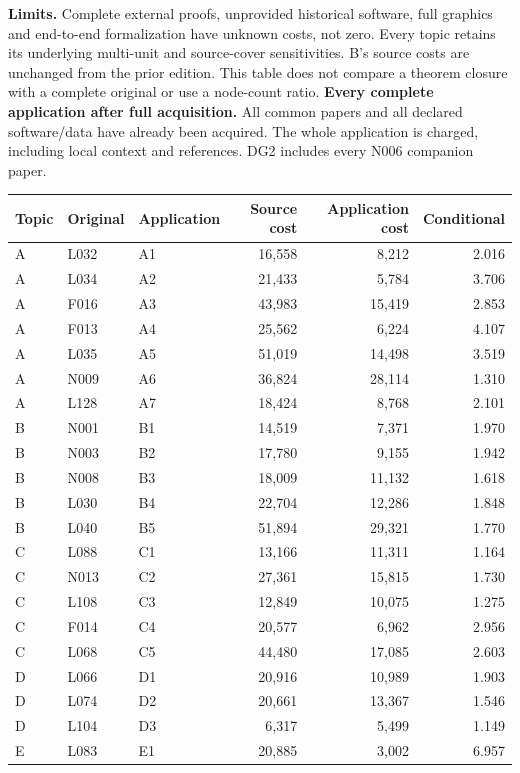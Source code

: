 \documentclass[11pt,a4paper]{article}
\newcommand{\tabsetup}{\small\setlength{\tabcolsep}{4pt}\renewcommand{\arraystretch}{1.10}}
\begin{document}
\textbf{Limits.} Complete external proofs, unprovided historical software, full graphics and end-to-end formalization have unknown costs, not zero. Every topic retains its underlying multi-unit and source-cover sensitivities. B's source costs are unchanged from the prior edition. This table does not compare a theorem closure with a complete original or use a node-count ratio.
\newpage
\textbf{Every complete application after full acquisition.}
All common papers and all declared software/data have already been acquired. The whole application is charged, including local context and references. DG2 includes every N006 companion paper.
\begin{center}\tabsetup\begin{tabular}{lllrrr}\toprule
Topic & Original & Application & Source cost & Application cost & Conditional\\\midrule
A & L032 & A1 & 16,558 & 8,212 & 2.016 \\
A & L034 & A2 & 21,433 & 5,784 & 3.706 \\
A & F016 & A3 & 43,983 & 15,419 & 2.853 \\
A & F013 & A4 & 25,562 & 6,224 & 4.107 \\
A & L035 & A5 & 51,019 & 14,498 & 3.519 \\
A & N009 & A6 & 36,824 & 28,114 & 1.310 \\
A & L128 & A7 & 18,424 & 8,768 & 2.101 \\
B & N001 & B1 & 14,519 & 7,371 & 1.970 \\
B & N003 & B2 & 17,780 & 9,155 & 1.942 \\
B & N008 & B3 & 18,009 & 11,132 & 1.618 \\
B & L030 & B4 & 22,704 & 12,286 & 1.848 \\
B & L040 & B5 & 51,894 & 29,321 & 1.770 \\
C & L088 & C1 & 13,166 & 11,311 & 1.164 \\
C & N013 & C2 & 27,361 & 15,815 & 1.730 \\
C & L108 & C3 & 12,849 & 10,075 & 1.275 \\
C & F014 & C4 & 20,577 & 6,962 & 2.956 \\
C & L068 & C5 & 44,480 & 17,085 & 2.603 \\
D & L066 & D1 & 20,916 & 10,989 & 1.903 \\
D & L074 & D2 & 20,661 & 13,367 & 1.546 \\
D & L104 & D3 & 6,317 & 5,499 & 1.149 \\
E & L083 & E1 & 20,885 & 3,002 & 6.957 \\

\end{tabular}
\end{center}
\end{document}

